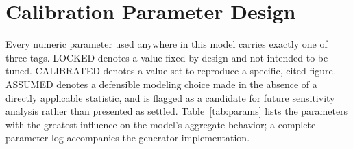 \documentclass[11pt]{article}
\begin{document}
\FloatBarrier
\section{Calibration Parameter Design}
\label{sec:calibration}

Every numeric parameter used anywhere in this model carries exactly one of three tags. LOCKED denotes a value fixed by design and not intended to be tuned. CALIBRATED denotes a value set to reproduce a specific, cited figure. ASSUMED denotes a defensible modeling choice made in the absence of a directly applicable statistic, and is flagged as a candidate for future sensitivity analysis rather than presented as settled. Table~\ref{tab:params} lists the parameters with the greatest influence on the model's aggregate behavior; a complete parameter log accompanies the generator implementation.
\end{document}
